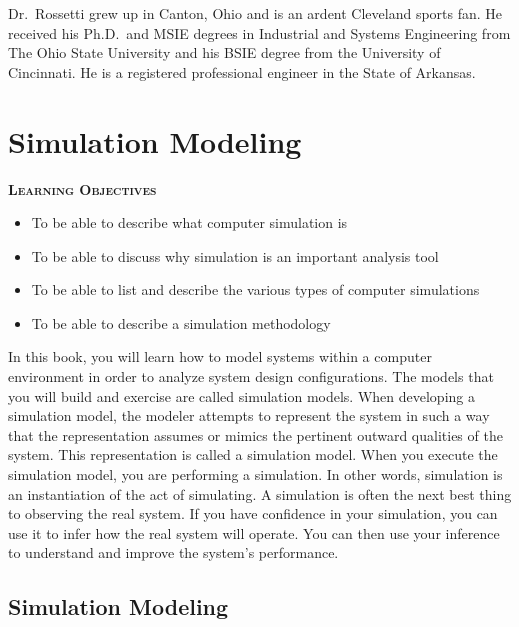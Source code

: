\documentclass[
]{book}
\theoremstyle{definition}
\theoremstyle{definition}
\theoremstyle{definition}
\theoremstyle{definition}
\theoremstyle{remark}
\begin{document}
Dr.~Rossetti grew up in Canton, Ohio and is an ardent Cleveland sports fan. He received his Ph.D.~and MSIE degrees in Industrial and Systems Engineering from The Ohio State University and his BSIE degree from the University of Cincinnati. He is a registered professional engineer in the State of Arkansas.

\hypertarget{ch1}{%
\chapter{Simulation Modeling}\label{ch1}}

\textbf{\textsc{Learning Objectives}}

\begin{itemize}
\item
  To be able to describe what computer simulation is
\item
  To be able to discuss why simulation is an important analysis tool
\item
  To be able to list and describe the various types of computer
  simulations
\item
  To be able to describe a simulation methodology
\end{itemize}

In this book, you will learn how to model systems within a computer
environment in order to analyze system design configurations. The models
that you will build and exercise are called simulation models. When
developing a simulation model, the modeler attempts to represent the
system in such a way that the representation assumes or mimics the
pertinent outward qualities of the system. This representation is called
a simulation model. When you execute the simulation model, you are
performing a simulation. In other words, simulation is an instantiation
of the act of simulating. A simulation is often the next best thing to
observing the real system. If you have confidence in your simulation,
you can use it to infer how the real system will operate. You can then
use your inference to understand and improve the system's performance.

\hypertarget{simulation-modeling}{%
\section{Simulation Modeling}\label{simulation-modeling}}
\end{document}

